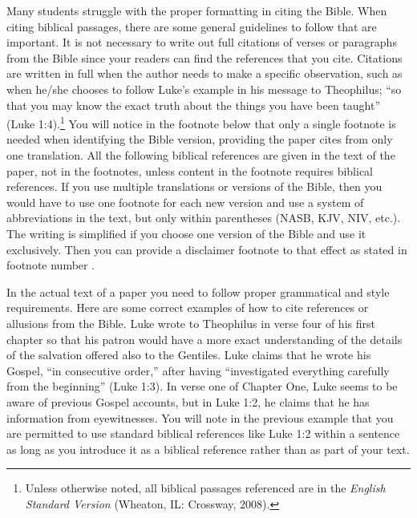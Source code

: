 \documentclass[raggedright]{turabian-researchpaper}
\begin{document}
Many students struggle with the proper formatting in citing the Bible. When
citing biblical passages, there are some general guidelines to follow that are
important. It is not necessary to write out full citations of verses or
paragraphs from the Bible since your readers can find the references that you
cite. Citations are written in full when the author needs to make a specific
observation, such as when he/she chooses to follow Luke's example in his message
to Theophilus; ``so that you may know the exact truth about the things you have
been taught'' (Luke 1:4).\footnote{Unless otherwise noted, all biblical passages
referenced are in the \textit{English Standard Version} (Wheaton, IL: Crossway,
2008).} You will notice in the footnote below that only a single footnote is
needed when identifying the Bible version, providing the paper cites from only
one translation. All the following biblical references are given in the text of
the paper, not in the footnotes, unless content in the footnote requires
biblical references. If you use multiple translations or versions of the Bible,
then you would have to use one footnote for each new version and use a system of
abbreviations in the text, but only within parentheses (NASB, KJV, NIV, etc.).
The writing is simplified if you choose one version of the Bible and use it
exclusively. Then you can provide a disclaimer footnote to that effect as stated
in footnote number
\hyperref[fn:eight]{}.

In the actual text of a paper you need to follow proper grammatical and style
requirements. Here are some correct examples of how to cite references or
allusions from the Bible. Luke wrote to Theophilus in verse four of his first
chapter so that his patron would have a more exact understanding of the details
of the salvation offered also to the Gentiles. Luke claims that he wrote his
Gospel, ``in consecutive order,'' after having ``investigated everything
carefully from the beginning'' (Luke 1:3). In verse one of Chapter One, Luke
seems to be aware of previous Gospel accounts, but in Luke 1:2, he claims that
he has information from eyewitnesses. You will note in the previous example that
you are permitted to use standard biblical references like Luke 1:2 within a
sentence as long as you introduce it as a biblical reference rather than as part
of your text.
\end{document}

